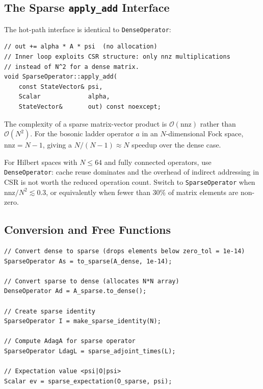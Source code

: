 \documentclass[11pt,a4paper,twoside]{book}
\newcommand{\Order}{\mathcal{O}}
\newcommand{\code}[1]{\texttt{\small#1}}
\theoremstyle{definition}
\theoremstyle{remark}
\begin{document}
\subsection{The Sparse \texttt{apply\_add} Interface}
\label{subsec:sparse-apply-add}

The hot-path interface is identical to \code{DenseOperator}:

\begin{verbatim}
// out += alpha * A * psi  (no allocation)
// Inner loop exploits CSR structure: only nnz multiplications
// instead of N^2 for a dense matrix.
void SparseOperator::apply_add(
    const StateVector& psi,
    Scalar             alpha,
    StateVector&       out) const noexcept;
\end{verbatim}

The complexity of a sparse matrix-vector product is $\Order(\mathrm{nnz})$
rather than $\Order(N^2)$. For the bosonic ladder operator $a$ in an
$N$-dimensional Fock space, $\mathrm{nnz} = N-1$, giving a
$N/(N-1) \approx N$ speedup over the dense case.

\begin{perfbox}
  For Hilbert spaces with $N \leq 64$ and fully connected operators,
  use \code{DenseOperator}: cache reuse dominates and the overhead of
  indirect addressing in CSR is not worth the reduced operation count.
  Switch to \code{SparseOperator} when $\mathrm{nnz} / N^2 \lesssim 0.3$,
  or equivalently when fewer than 30\% of matrix elements are non-zero.
\end{perfbox}

\subsection{Conversion and Free Functions}
\label{subsec:sparse-free}

\begin{verbatim}
// Convert dense to sparse (drops elements below zero_tol = 1e-14)
SparseOperator As = to_sparse(A_dense, 1e-14);

// Convert sparse to dense (allocates N*N array)
DenseOperator Ad = A_sparse.to_dense();

// Create sparse identity
SparseOperator I = make_sparse_identity(N);

// Compute AdagA for sparse operator
SparseOperator LdagL = sparse_adjoint_times(L);

// Expectation value <psi|O|psi>
Scalar ev = sparse_expectation(O_sparse, psi);
\end{verbatim}
\end{document}
